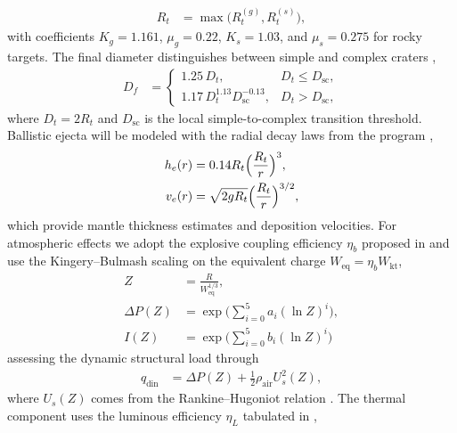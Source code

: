 \documentclass[conference]{IEEEtran}
\begin{document}
\begin{itemize}
\begin{align}
		      R_t       & = \max\bigl(R_t^{(g)}, R_t^{(s)}\bigr), \label{eq:rt-final}
	      \end{align}
	      with coefficients $K_g = 1.161$, $\mu_g = 0.22$, $K_s = 1.03$, and
	      $\mu_s = 0.275$ for rocky targets. The final diameter distinguishes
	      between simple and complex craters \cite{collins2005,herrick1997},
	      \begin{align}
		      D_f & =
		      \begin{cases}
			      1.25\,D_t,                              & D_t \le D_{\text{sc}}, \\
			      1.17\,D_t^{1.13} D_{\text{sc}}^{-0.13}, & D_t > D_{\text{sc}},
		      \end{cases}\label{eq:final-crater}
	      \end{align}
	      where $D_t = 2 R_t$ and $D_{\text{sc}}$ is the local simple-to-complex
	      transition threshold. Ballistic ejecta will be modeled with the radial
	      decay laws from the program \cite{collins2005,herrick2006},
	      \begin{align}
		      h_e(r) & = 0.14 R_t \Bigl(\frac{R_t}{r}\Bigr)^3, \label{eq:ejecta-thickness} \\
		      v_e(r) & = \sqrt{2 g R_t}\Bigl(\frac{R_t}{r}\Bigr)^{3/2},
	      \end{align}
	      which provide mantle thickness estimates and deposition velocities. For
	      atmospheric effects we adopt the explosive coupling efficiency $\eta_b$
	      proposed in \cite{collins2005} and use the Kingery--Bulmash scaling
	      \cite{ufc334002} on the equivalent charge $W_{\text{eq}} = \eta_b
		      W_{\text{kt}}$,
	      \begin{align}
		      Z           & = \frac{R}{W_{\text{eq}}^{1/3}},                  \\
		      \Delta P(Z) & = \exp\Biggl(\sum_{i=0}^{5} a_i (\ln Z)^i\Biggr), \\
		      I(Z)        & = \exp\Biggl(\sum_{i=0}^{5} b_i (\ln Z)^i\Biggr)
	      \end{align}
	      assessing the dynamic structural load through
	      \begin{align}
		      q_{\text{din}} & = \Delta P(Z) + \tfrac{1}{2} \rho_{\text{air}} U_s^2(Z),
	      \end{align}
	      where $U_s(Z)$ comes from the Rankine--Hugoniot relation
	      \cite{ufc334002}. The thermal component uses the luminous efficiency
	      $\eta_L$ tabulated in \cite{collins2005},
	      \begin{align}

\end{align}
\end{itemize}
\end{document}
